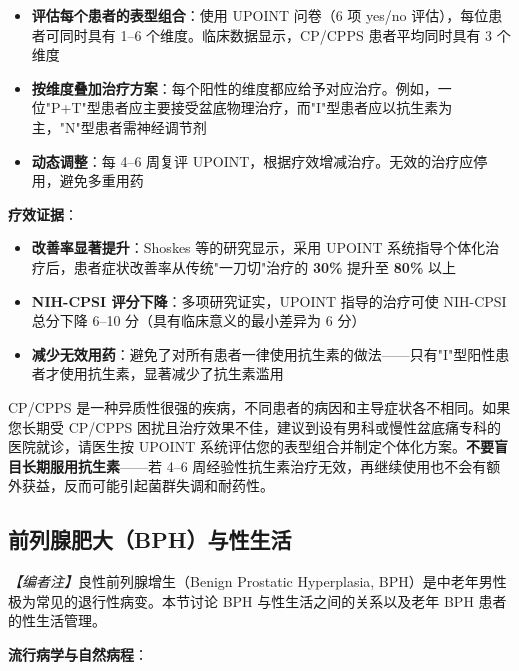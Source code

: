 \begin{itemize}[leftmargin=2cm]
	\item \textbf{评估每个患者的表型组合}：使用 UPOINT 问卷（6 项 yes/no 评估），每位患者可同时具有 1--6 个维度。临床数据显示，CP/CPPS 患者平均同时具有 3 个维度
	\item \textbf{按维度叠加治疗方案}：每个阳性的维度都应给予对应治疗。例如，一位"P+T"型患者应主要接受盆底物理治疗，而"I"型患者应以抗生素为主，"N"型患者需神经调节剂
	\item \textbf{动态调整}：每 4--6 周复评 UPOINT，根据疗效增减治疗。无效的治疗应停用，避免多重用药
\end{itemize}

\vspace{0.5em}
\noindent\textbf{疗效证据}：

\begin{itemize}[leftmargin=2cm]
	\item \textbf{改善率显著提升}：Shoskes 等的研究显示，采用 UPOINT 系统指导个体化治疗后，患者症状改善率从传统"一刀切"治疗的 \textbf{30\%} 提升至 \textbf{80\%} 以上
	\item \textbf{NIH-CPSI 评分下降}：多项研究证实，UPOINT 指导的治疗可使 NIH-CPSI 总分下降 6--10 分（具有临床意义的最小差异为 6 分）
	\item \textbf{减少无效用药}：避免了对所有患者一律使用抗生素的做法——只有"I"型阳性患者才使用抗生素，显著减少了抗生素滥用
\end{itemize}

\begin{tcolorbox}[colback=pink!5!white,colframe=red!50!black,title=贴心小叮咛]
CP/CPPS 是一种异质性很强的疾病，不同患者的病因和主导症状各不相同。如果您长期受 CP/CPPS 困扰且治疗效果不佳，建议到设有男科或慢性盆底痛专科的医院就诊，请医生按 UPOINT 系统评估您的表型组合并制定个体化方案。\textbf{不要盲目长期服用抗生素}——若 4--6 周经验性抗生素治疗无效，再继续使用也不会有额外获益，反而可能引起菌群失调和耐药性。
\end{tcolorbox}

\subsection{前列腺肥大（BPH）与性生活}

\noindent\textit{【编者注】}良性前列腺增生（Benign Prostatic Hyperplasia, BPH）是中老年男性极为常见的退行性病变。本节讨论 BPH 与性生活之间的关系以及老年 BPH 患者的性生活管理。

\vspace{0.5em}
\noindent\textbf{流行病学与自然病程}：

